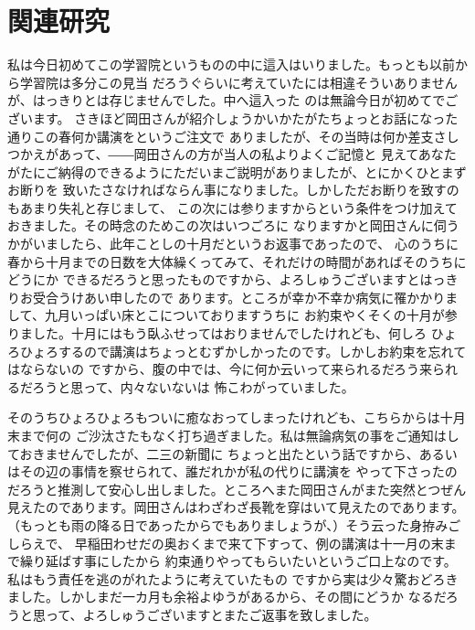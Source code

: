 \chapter{関連研究}
私は今日初めてこの学習院というものの中に這入はいりました。もっとも以前から学習院は多分この見当
だろうぐらいに考えていたには相違そういありませんが、はっきりとは存じませんでした。中へ這入った
のは無論今日が初めてでございます。
さきほど岡田さんが紹介しょうかいかたがたちょっとお話になった通りこの春何か講演をというご注文で
ありましたが、その当時は何か差支さしつかえがあって、――岡田さんの方が当人の私よりよくご記憶と
見えてあなたがたにご納得のできるようにただいまご説明がありましたが、とにかくひとまずお断りを
致いたさなければならん事になりました。しかしただお断りを致すのもあまり失礼と存じまして、
この次には参りますからという条件をつけ加えておきました。その時念のためこの次はいつごろに
なりますかと岡田さんに伺うかがいましたら、此年ことしの十月だというお返事であったので、
心のうちに春から十月までの日数を大体繰くってみて、それだけの時間があればそのうちにどうにか
できるだろうと思ったものですから、よろしゅうございますとはっきりお受合うけあい申したので
あります。ところが幸か不幸か病気に罹かかりまして、九月いっぱい床とこについておりますうちに
お約束やくそくの十月が参りました。十月にはもう臥ふせってはおりませんでしたけれども、何しろ
ひょろひょろするので講演はちょっとむずかしかったのです。しかしお約束を忘れてはならないの
ですから、腹の中では、今に何か云いって来られるだろう来られるだろうと思って、内々ないないは
怖こわがっていました。

そのうちひょろひょろもついに癒なおってしまったけれども、こちらからは十月末まで何の
ご沙汰さたもなく打ち過ぎました。私は無論病気の事をご通知はしておきませんでしたが、二三の新聞に
ちょっと出たという話ですから、あるいはその辺の事情を察せられて、誰だれかが私の代りに講演を
やって下さったのだろうと推測して安心し出しました。ところへまた岡田さんがまた突然とつぜん
見えたのであります。岡田さんはわざわざ長靴を穿はいて見えたのであります。
（もっとも雨の降る日であったからでもありましょうが、）そう云った身拵みごしらえで、
早稲田わせだの奥おくまで来て下すって、例の講演は十一月の末まで繰り延ばす事にしたから
約束通りやってもらいたいというご口上なのです。私はもう責任を逃のがれたように考えていたもの
ですから実は少々驚おどろきました。しかしまだ一カ月も余裕よゆうがあるから、その間にどうか
なるだろうと思って、よろしゅうございますとまたご返事を致しました。


